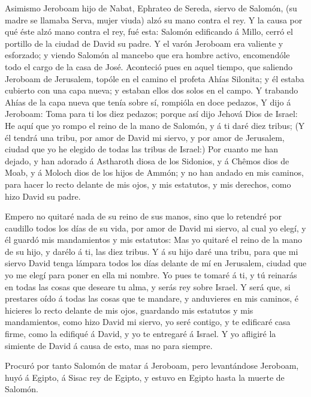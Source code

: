  Asimismo Jeroboam hijo de Nabat, Ephrateo de Sereda,
siervo de Salomón, (su madre se llamaba Serva, mujer viuda) alzó su mano
contra el rey.  Y la causa por qué éste alzó mano contra
el rey, fué esta: Salomón edificando á Millo, cerró el portillo de la
ciudad de David su padre.  Y el varón Jeroboam era
valiente y esforzado; y viendo Salomón al mancebo que era hombre activo,
encomendóle todo el cargo de la casa de José.  Aconteció
pues en aquel tiempo, que saliendo Jeroboam de Jerusalem, topóle en el
camino el profeta Ahías Silonita; y él estaba cubierto con una capa
nueva; y estaban ellos dos solos en el campo.  Y trabando
Ahías de la capa nueva que tenía sobre sí, rompióla en doce pedazos,
 Y dijo á Jeroboam: Toma para ti los diez pedazos; porque
así dijo Jehová Dios de Israel: He aquí que yo rompo el reino de la mano
de Salomón, y á ti daré diez tribus;  (Y él tendrá una
tribu, por amor de David mi siervo, y por amor de Jerusalem, ciudad que
yo he elegido de todas las tribus de Israel:)  Por cuanto
me han dejado, y han adorado á Astharoth diosa de los Sidonios, y á
Chêmos dios de Moab, y á Moloch dios de los hijos de Ammón; y no han
andado en mis caminos, para hacer lo recto delante de mis ojos, y mis
estatutos, y mis derechos, como hizo David su padre.

 Empero no quitaré nada de su reino de sus manos, sino
que lo retendré por caudillo todos los días de su vida, por amor de
David mi siervo, al cual yo elegí, y él guardó mis mandamientos y mis
estatutos:  Mas yo quitaré el reino de la mano de su
hijo, y darélo á ti, las diez tribus.  Y á su hijo daré
una tribu, para que mi siervo David tenga lámpara todos los días delante
de mí en Jerusalem, ciudad que yo me elegí para poner en ella mi nombre.
 Yo pues te tomaré á ti, y tú reinarás en todas las cosas
que deseare tu alma, y serás rey sobre Israel.  Y será
que, si prestares oído á todas las cosas que te mandare, y anduvieres en
mis caminos, é hicieres lo recto delante de mis ojos, guardando mis
estatutos y mis mandamientos, como hizo David mi siervo, yo seré
contigo, y te edificaré casa firme, como la edifiqué á David, y yo te
entregaré á Israel.  Y yo afligiré la simiente de David á
causa de esto, mas no para siempre.

 Procuró por tanto Salomón de matar á Jeroboam, pero
levantándose Jeroboam, huyó á Egipto, á Sisac rey de Egipto, y estuvo en
Egipto hasta la muerte de Salomón.

